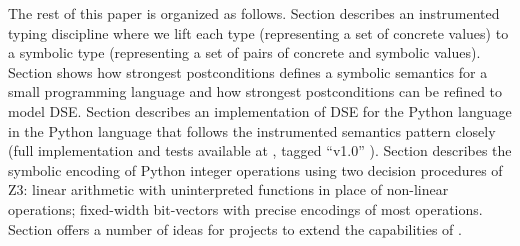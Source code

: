 \documentclass{IOS-Book-Article}
\begin{document}
\begin{mdP}[data-line={306}]%
{}The rest of this paper is organized as follows. Section%
{}{\mdNbsp}%
{} 
describes an instrumented typing discipline where we lift each type (representing 
a set of concrete values) to a symbolic type (representing
a set of pairs of concrete and symbolic values).
Section%
{}{\mdNbsp}%
{} shows how strongest postconditions defines a symbolic
semantics for a small programming language and how strongest postconditions
can be refined to model DSE.
Section%
{}{\mdNbsp}%
{} describes an implementation of DSE for the Python language
in the Python language that follows the instrumented semantics pattern closely
(full implementation and tests available at%
{}{\mdNbsp}%
{}, tagged %
{}{\textquotedblleft}v1.0{\textquotedblright}%
{}).
Section%
{}{\mdNbsp}%
{} describes the symbolic encoding of Python integer 
operations using two decision procedures of Z3: linear arithmetic with
uninterpreted functions in place of non-linear operations;
fixed-width bit-vectors with precise encodings of most operations.
Section%
{}{\mdNbsp}%
{} offers a number of ideas for projects
to extend the capabilities of%
{}{\mdNbsp}%
{}.%
\end{mdP}%
\end{document}
